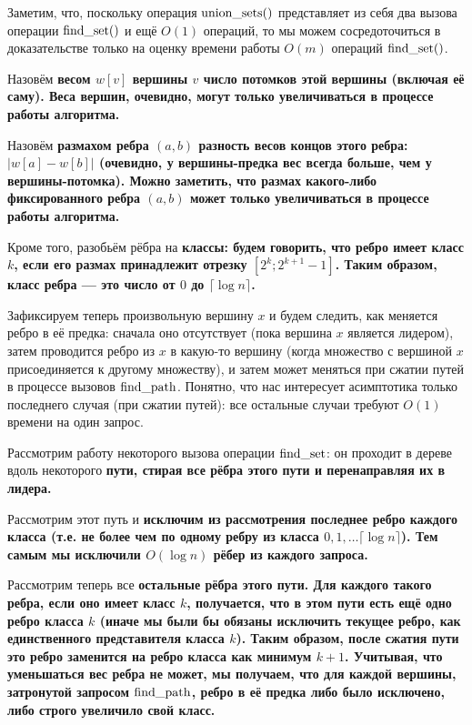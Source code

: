Заметим, что, поскольку операция ${\rm union\_sets}()$ представляет из себя два вызова операции ${\rm find\_set}()$ и ещё $O(1)$ операций, то мы можем сосредоточиться в доказательстве только на оценку времени работы $O(m)$ операций ${\rm find\_set}()$.

Назовём \bf{весом} $w[v]$ вершины $v$ число потомков этой вершины (включая её саму). Веса вершин, очевидно, могут только увеличиваться в процессе работы алгоритма.

Назовём \bf{размахом ребра} $(a,b)$ разность весов концов этого ребра: $|w[a] - w[b]|$ (очевидно, у вершины-предка вес всегда больше, чем у вершины-потомка). Можно заметить, что размах какого-либо фиксированного ребра $(a,b)$ может только увеличиваться в процессе работы алгоритма.

Кроме того, разобьём рёбра на \bf{классы}: будем говорить, что ребро имеет класс $k$, если его размах принадлежит отрезку $[2^k; 2^{k+1}-1]$. Таким образом, класс ребра --- это число от $0$ до $\lceil \log n \rceil$.

Зафиксируем теперь произвольную вершину $x$ и будем следить, как меняется ребро в её предка: сначала оно отсутствует (пока вершина $x$ является лидером), затем проводится ребро из $x$ в какую-то вершину (когда множество с вершиной $x$ присоединяется к другому множеству), и затем может меняться при сжатии путей в процессе вызовов ${\rm find\_path}$. Понятно, что нас интересует асимптотика только последнего случая (при сжатии путей): все остальные случаи требуют $O(1)$ времени на один запрос.

Рассмотрим работу некоторого вызова операции ${\rm find\_set}$: он проходит в дереве вдоль некоторого \bf{пути}, стирая все рёбра этого пути и перенаправляя их в лидера.

Рассмотрим этот путь и \bf{исключим} из рассмотрения последнее ребро каждого класса (т.е. не более чем по одному ребру из класса $0, 1, \ldots \lceil \log n \rceil$). Тем самым мы исключили $O(\log n)$ рёбер из каждого запроса.

Рассмотрим теперь все \bf{остальные} рёбра этого пути. Для каждого такого ребра, если оно имеет класс $k$, получается, что в этом пути есть ещё одно ребро класса $k$ (иначе мы были бы обязаны исключить текущее ребро, как единственного представителя класса $k$). Таким образом, после сжатия пути это ребро заменится на ребро класса как минимум $k+1$. Учитывая, что уменьшаться вес ребра не может, мы получаем, что для каждой вершины, затронутой запросом $\rm find\_path$, ребро в её предка либо было исключено, либо строго увеличило свой класс.

